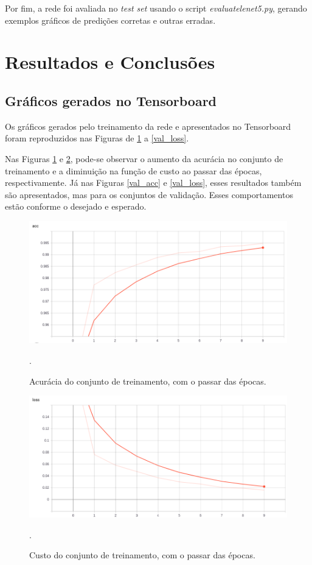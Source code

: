 \documentclass[conference]{IEEEtran}
\begin{document}
Por fim, a rede foi avaliada no \textit{test set} usando o script \textit{evaluate\underline{\space}lenet5.py}, gerando exemplos gráficos de predições corretas e outras erradas.

\section{Resultados e Conclusões}

\subsection{Gráficos gerados no Tensorboard}
Os gráficos gerados pelo treinamento da rede e apresentados no Tensorboard foram reproduzidos nas Figuras de \ref{acc} a \ref{val_loss}.

Nas Figuras \ref{acc} e \ref{loss}, pode-se observar o aumento da acurácia no conjunto de treinamento e a diminuição na função de custo ao passar das épocas, respectivamente. Já nas Figuras \ref{val_acc} e \ref{val_loss}, esses resultados também são apresentados, mas para os conjuntos de validação. Esses comportamentos estão conforme o desejado e esperado.

\begin{figure}[htbp]
\centering
\centerline{\includegraphics[scale=0.25]{imagens/acc.png}}
\caption{Acurácia do conjunto de treinamento, com o passar das épocas.}.
\label{acc}
\end{figure}

\begin{figure}[htbp]
\centering
\centerline{\includegraphics[scale=0.25]{imagens/loss.png}}
\caption{Custo do conjunto de treinamento, com o passar das épocas.}.
\label{loss}
\end{figure}
\end{document}
